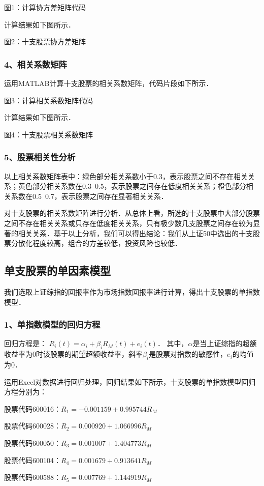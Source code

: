 图1：计算协方差矩阵代码

计算结果如下图所示．

图2：十支股票协方差矩阵

\subsubsection{4、相关系数矩阵}
运用MATLAB计算十支股票的相关系数矩阵，代码片段如下所示．

图3：计算相关系数矩阵代码

计算结果如下图所示．

图4：十支股票相关系数矩阵
\subsubsection{5、股票相关性分析}
以上相关系数矩阵表中：绿色部分相关系数小于0.3，表示股票之间不存在相关关系；黄色部分相关系数在0.3~0.5，表示股票之间存在低度相关关系；橙色部分相关系数在0.5~0.7，表示股票之间存在显著相关关系．

对十支股票的相关系数矩阵进行分析．从总体上看，所选的十支股票中大部分股票之间不存在相关关系或只存在低度相关关系，只有极少数几支股票之间存在较为显著的相关关系．基于以上分析，我们可以得出结论：我们从上证50中选出的十支股票分散化程度较高，组合的方差较低，投资风险也较低．

\subsection{单支股票的单因素模型}
我们选取上证综指的回报率作为市场指数回报率进行计算，得出十支股票的单指数模型．
\subsubsection{1、单指数模型的回归方程}

回归方程是：
$R_{i}(t)=\alpha_{i}+\beta_{i}R_{M}(t)+e_{i}(t)$．
其中，$\alpha$是当上证综指的超额收益率为0时该股票的期望超额收益率，斜率$\beta_{i}$是股票对指数的敏感性，$e_{i}$的均值为0．

运用Excel对数据进行回归处理，回归结果如下所示，十支股票的单指数模型回归方程分别为：

股票代码600016：$R_{1}=-0.001159 + 0.995744R_{M}$

股票代码600028：$R_{2}=0.000920 + 1.066996R_{M}$

股票代码600050：$R_{3}=0.001007 + 1.404773R_{M}$

股票代码600104：$R_{4}=0.001679 + 0.913641R_{M}$

股票代码600588：$R_{5}=0.007769 + 1.144919R_{M}$

